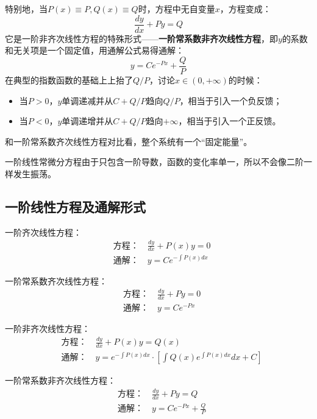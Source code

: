 特别地，当$P\left( x \right) \equiv P,Q\left( x \right) \equiv Q$时，方程中无自变量$x$，方程变成：
\[
\frac{dy}{dx}+Py=Q
\]
它是一阶非齐次线性方程的特殊形式——{\bf 一阶常系数非齐次线性方程}，即$y$的系数和无关项是一个固定值，用通解公式易得通解：
\[
y=Ce^{-Px}+\frac{Q}{P}
\]
在典型的指数函数的基础上上抬了$Q/P$，讨论$x\in \left( 0,+\infty \right) $的时候：
\begin{itemize}
    \item 当$P>0$，$y$单调递减并从$C+Q/P$趋向$Q/P$，相当于引入一个负反馈；
    \item 当$P<0$，$y$单调递增并从$C+Q/P$趋向$+\infty $，相当于引入一个正反馈。
\end{itemize}
和一阶常系数齐次线性方程对比看，整个系统有一个“固定能量”。

一阶线性常微分方程由于只包含一阶导数，函数的变化率单一，所以不会像二阶一样发生振荡。

\subsection{一阶线性方程及通解形式}

一阶齐次线性方程：
\begin{align*}
&\text{方程：} \quad \frac{dy}{dx}+P\left( x \right) y=0 \\
&\text{通解：} \quad y=Ce^{-\int{P\left( x \right) dx}}
\end{align*}

一阶常系数齐次线性方程：
\begin{align*}
&\text{方程：} \quad \frac{dy}{dx}+Py=0 \\
&\text{通解：} \quad y=Ce^{-Px}
\end{align*}

一阶非齐次线性方程：
\begin{align*}
&\text{方程：} \quad \frac{dy}{dx}+P\left( x \right) y=Q\left( x \right) \\
&\text{通解：} \quad y=e^{-\int{P\left( x \right) dx}}\cdot \left[ \int{Q\left( x \right) e^{\int{P\left( x \right) dx}}dx}+C \right]
\end{align*}

一阶常系数非齐次线性方程：
\begin{align*}
&\text{方程：} \quad \frac{dy}{dx}+Py=Q \\
&\text{通解：} \quad y=Ce^{-Px}+\frac{Q}{P}
\end{align*}





